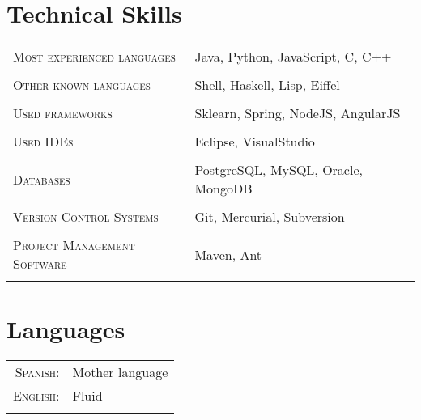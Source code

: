 \documentclass[a4paper,10pt]{article} %
\begin{document}
\section{Technical Skills}
\begin{tabular}{ll}
\textsc{Most experienced languages} & Java, Python, JavaScript, C, C++ \\ & \\

\textsc{Other known languages} & Shell, Haskell, Lisp, Eiffel \\ & \\

\textsc{Used frameworks} & Sklearn, Spring, NodeJS, AngularJS \\ & \\

\textsc{Used IDEs} & Eclipse, VisualStudio \\ & \\

\textsc{Databases} & PostgreSQL, MySQL, Oracle, MongoDB \\ & \\

\textsc{Version Control Systems} & Git, Mercurial, Subversion \\ & \\

\textsc{Project Management Software} & Maven, Ant \\ & \\
\end{tabular}

\section{Languages}
\begin{tabular}{rl}
\\
\textsc{Spanish:} & Mother language\\
\textsc{English:} & Fluid \\ & \\
\end{tabular}
\end{document}
